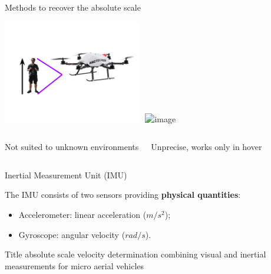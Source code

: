 \documentclass{beamer}
\begin{document}


\begin{frame}{Methods to recover the absolute scale}


  \includegraphics[width=0.45\textwidth]{images/referenceInEnv.png}~
  \includegraphics<2->[width=0.45\textwidth]{images/altitudeSensor.png}

  \begin{columns}[T] %
    \centering
    Not suited to unknown environments

    \centering
    Unprecise, works only in hover
\end{columns}

\end{frame}

\begin{frame}{Inertial Measurement Unit (IMU)}

The IMU consists of two sensors providing \textbf{physical quantities}:
\begin{itemize}
\item Accelerometer: linear acceleration ($m/s^2$);
\item Gyroscope: angular velocity ($rad/s$).
\end{itemize}

\end{frame}

\begin{frame}{Title}
absolute scale velocity determination combining visual and inertial measurements for micro aerial vehicles
\end{frame}
\end{document}
